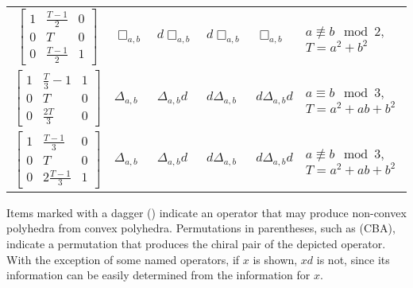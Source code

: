 \documentclass{amsart}[12pt]
\begin{document}
\begin{longtable}{c|p{2cm}|p{2cm}|p{2cm}|p{2cm}|p{3cm}}
    $\begin{bmatrix}
    1 & \frac{T-1}{2} & 0 \\
    0 & T & 0 \\
    0 & \frac{T-1}{2} & 1 \end{bmatrix}$& $\Box_{a,b}$ & $d\Box_{a,b}$ & $d\Box_{a,b}$ & $\Box_{a,b}$ & $a \not\equiv b \mod 2$, $T=a^2+b^2$
    \\
    $\begin{bmatrix}
    1 & \frac{T}{3} - 1 & 1 \\
    0 & T & 0 \\
    0 & \frac{2T}{3} & 0 \end{bmatrix}$& $\Delta_{a,b}$ & $\Delta_{a,b}d$ & $d\Delta_{a,b}$ & $d\Delta_{a,b}d$ & $a \equiv b \mod 3$, $T=a^2+ab+b^2$
    \\
    $\begin{bmatrix}
    1 & \frac{T-1}{3} & 0 \\
    0 & T & 0 \\
    0 & 2\frac{T-1}{3} & 1 \end{bmatrix}$& $\Delta_{a,b}$ & $\Delta_{a,b}d$ & $d\Delta_{a,b}$ & $d\Delta_{a,b}d$ & $a \not\equiv b \mod 3$, $T=a^2+ab+b^2$

\end{longtable}

Items marked with a dagger (\dag) indicate an operator that may produce non-convex polyhedra from convex polyhedra. Permutations in parentheses, such as (CBA), indicate a permutation that produces the chiral pair of the depicted operator. With the exception of some named operators, if $x$ is shown, $xd$ is not, since its information can be easily determined from the information for
$x$.
\end{document}
